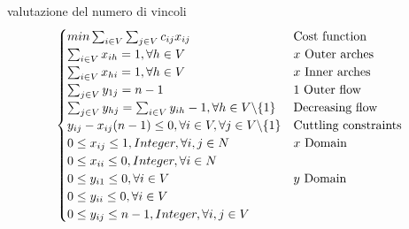valutazione del numero di vincoli 
\begin{equation}
\begin{cases}
	min \sum_{i\in V}\sum_{j\in V} c_{ij}x_{ij}  & \text{Cost function} \\
	\sum_{i\in V} x_{ih} = 1, \forall h \in V  & \text{$ x $ Outer arches} \\
	\sum_{i\in V} x_{hi} = 1, \forall h \in V  & \text{$ x $ Inner arches} \\
	\sum_{j\in V} y_{1j} = n-1  & \text{$ 1 $ Outer flow} \\
	\sum_{j\in V} y_{hj} = \sum_{i \in V}y_{ih} - 1, \forall h \in V \backslash \{1\}  & \text{Decreasing flow} \\
	y_{ij} - x_{ij}(n-1) \le 0, \forall i \in V, \forall j \in V \backslash \{1\}  & \text{Cuttling constraints} \\
	0 \le x_{ij} \le 1, Integer, \forall i,j \in N  & \text{$ x $ Domain} \\
	0 \le x_{ii} \le 0, Integer, \forall i \in N & \text{} \\
	0 \le y_{i1} \le 0, \forall i \in V  & \text{$ y $ Domain} \\
	0 \le y_{ii} \le 0, \forall i \in V  & \text{} \\
	0 \le y_{ij} \le n-1, Integer, \forall i,j \in V  & \text{} 
\end{cases}
\end{equation}